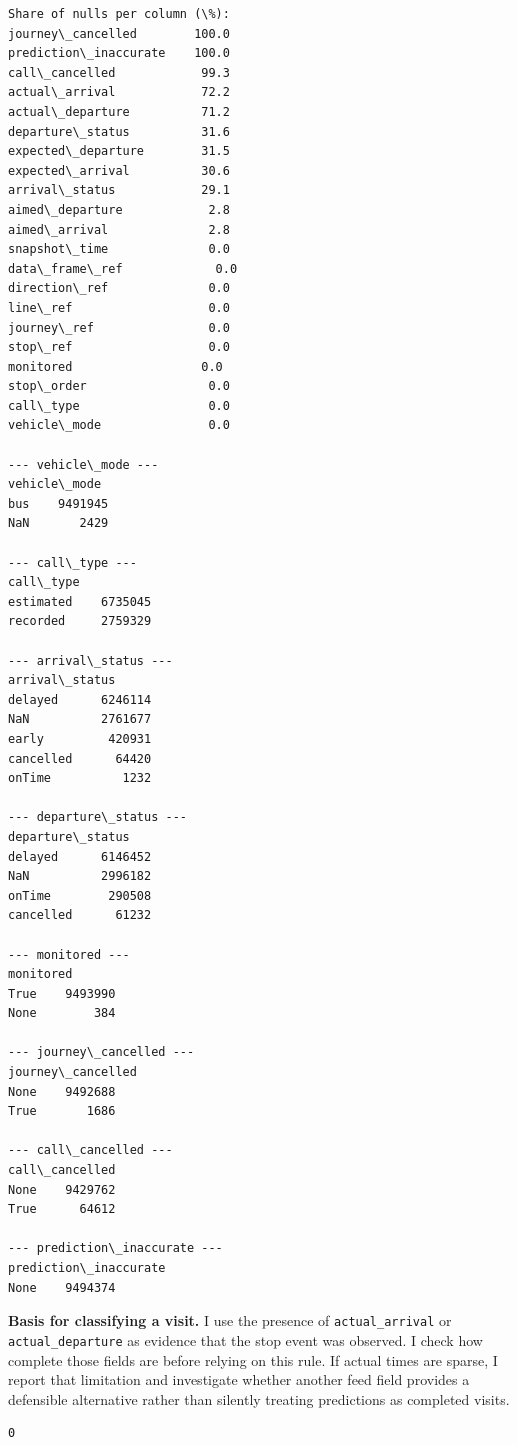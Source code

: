 \documentclass[11pt]{article}
\begin{document}
    \begin{Verbatim}[commandchars=\\\{\}]
Share of nulls per column (\%):
journey\_cancelled        100.0
prediction\_inaccurate    100.0
call\_cancelled            99.3
actual\_arrival            72.2
actual\_departure          71.2
departure\_status          31.6
expected\_departure        31.5
expected\_arrival          30.6
arrival\_status            29.1
aimed\_departure            2.8
aimed\_arrival              2.8
snapshot\_time              0.0
data\_frame\_ref             0.0
direction\_ref              0.0
line\_ref                   0.0
journey\_ref                0.0
stop\_ref                   0.0
monitored                  0.0
stop\_order                 0.0
call\_type                  0.0
vehicle\_mode               0.0

--- vehicle\_mode ---
vehicle\_mode
bus    9491945
NaN       2429

--- call\_type ---
call\_type
estimated    6735045
recorded     2759329

--- arrival\_status ---
arrival\_status
delayed      6246114
NaN          2761677
early         420931
cancelled      64420
onTime          1232

--- departure\_status ---
departure\_status
delayed      6146452
NaN          2996182
onTime        290508
cancelled      61232

--- monitored ---
monitored
True    9493990
None        384

--- journey\_cancelled ---
journey\_cancelled
None    9492688
True       1686

--- call\_cancelled ---
call\_cancelled
None    9429762
True      64612

--- prediction\_inaccurate ---
prediction\_inaccurate
None    9494374
    \end{Verbatim}

    \textbf{Basis for classifying a visit.} I use the presence of
\texttt{actual\_arrival} or \texttt{actual\_departure} as evidence that
the stop event was observed. I check how complete those fields are
before relying on this rule. If actual times are sparse, I report that
limitation and investigate whether another feed field provides a
defensible alternative rather than silently treating predictions as
completed visits.

            \begin{tcolorbox}[breakable, size=fbox, boxrule=.5pt, pad at break*=1mm, opacityfill=0]
\begin{Verbatim}[commandchars=\\\{\}]
0
\end{Verbatim}
\end{tcolorbox}
        
\end{document}
